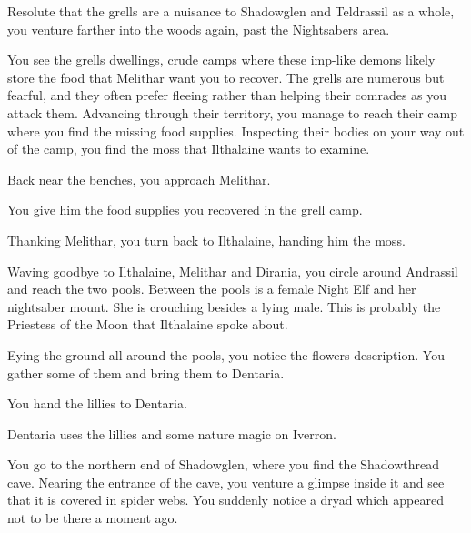 Resolute that the grells are a nuisance to Shadowglen and Teldrassil as a whole, you venture farther into the woods again, past the Nightsabers area.

You see the grells dwellings, crude camps where these imp-like demons likely store the food that Melithar want you to recover. The grells are numerous but fearful, and they often prefer fleeing rather than helping their comrades as you attack them. Advancing through their territory, you manage to reach their camp where you find the missing food supplies. Inspecting their bodies on your way out of the camp, you find the moss that Ilthalaine wants to examine.

Back near the benches, you approach Melithar.


You give him the food supplies you recovered in the grell camp.


Thanking Melithar, you turn back to Ilthalaine, handing him the moss.



Waving goodbye to Ilthalaine, Melithar and Dirania, you circle around Andrassil and reach the two pools. Between the pools is a female Night Elf and her nightsaber mount. She is crouching besides a lying male. This is probably the Priestess of the Moon that Ilthalaine spoke about.



Eying the ground all around the pools, you notice the flowers description. You gather some of them and bring them to Dentaria.


You hand the lillies to Dentaria.


Dentaria uses the lillies and some nature magic on Iverron.



You go to the northern end of Shadowglen, where you find the Shadowthread cave. Nearing the entrance of the cave, you venture a glimpse inside it and see that it is covered in spider webs. You suddenly notice a dryad which appeared not to be there a moment ago. %

